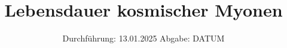 

\subject{v001}
\title{Lebensdauer kosmischer Myonen}
\date{%
  Durchführung: 13.01.2025
  \hspace{3em}
  Abgabe: DATUM
}



\maketitle
\thispagestyle{empty}
\tableofcontents
\newpage






\printbibliography{}


